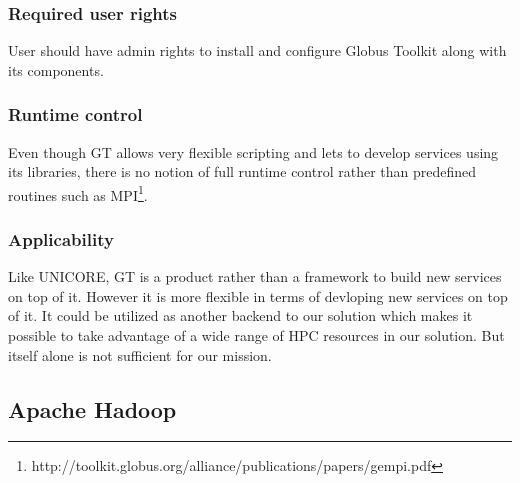\subsubsection {Required user rights}
User should have admin rights to install and configure Globus Toolkit along with its components.
\subsubsection {Runtime control}
Even though GT allows very flexible scripting and lets to develop services using its libraries, there is no notion
of full runtime control rather than predefined routines such 
as MPI\footnote{http://toolkit.globus.org/alliance/publications/papers/gempi.pdf}.
\subsubsection {Applicability}
Like UNICORE, GT is a product rather than a framework to build new services on top of it. However it is more flexible
in terms of devloping new services on top of it. It could be utilized as another backend to our solution which makes it
possible to take advantage of a wide range of HPC resources in our solution. But itself alone is not sufficient for 
our mission.

\subsection{Apache Hadoop}

